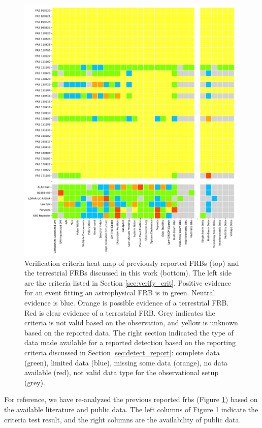 \documentclass[a4paper,fleqn,usenatbib]{mnras}
\begin{document}
\begin{figure}
    \includegraphics[width=1.0\linewidth]{verification/FRBheatmap.pdf}
    \caption{Verification criteria heat map of previously reported FRBs (top)
    and the terrestrial FRBs discussed in this work (bottom). The left side are
    the criteria listed in Section \ref{sec:verify_crit}. Positive evidence for
    an event fitting an astrophysical FRB is in green. Neutral evidence is blue.
    Orange is possible evidence of a terrestrial FRB. Red is clear evidence of a
    terrestrial FRB. Grey indicates the criteria is not valid based on the
    observation, and yellow is unknown based on the reported data. The right
    section indicated the type of data made available for a reported detection
    based on the reporting criteria discussed in Section
    \ref{sec:detect_report}: complete data (green), limited data (blue), missing
    some data (orange), no data available (red), not valid data type for the
    observational setup (grey).
    }
    \label{fig:heat_map}
\end{figure}

For reference, we have re-analyzed the previous reported \glspl{frb} (Figure
\ref{fig:heat_map}) based on the available literature and public data. The left
columns of Figure \ref{fig:heat_map} indicate the criteria test result, and the
right columns are the availability of public data.
\end{document}

